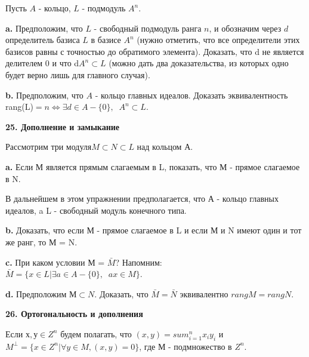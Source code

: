 \documentclass{../template/mai_book}
\begin{document}
\medskip

Пусть $A$ - кольцо, $L$ - подмодуль $A^n$. 

\medskip

{\bf a.} Предположим, что $L$ - свободный подмодуль ранга $n$, и 
обозначим через $d$ определитель базиса $L$ в базисе $A^n$ (нужно отметить, 
что все определители этих базисов равны с точностью до 
обратимого элемента). Доказать, что d не является делителем 0 и что d$A^n \subset L$ 
(можно дать два доказательства, из которых одно будет верно лишь 
для главного случая). 

\medskip

{\bf b.} Предположим, что $A$ - кольцо главных идеалов. Доказать 
эквивалентность rang(L)$ = n\Longleftrightarrow \exists d \in A - \{0\}, \;\;A^n \subset L .$

\pagebreak


{\noindent\bf25. Дополнение и замыкание }

\medskip

Рассмотрим три модуля$ M \subset N \subset L$ над кольцом А. 

\medskip

{\bf a.} Если М является прямым слагаемым в L, показать, что М - 
прямое слагаемое в N. 

\medskip

В дальнейшем в этом упражнении предполагается, что А - кольцо 
главных идеалов, a L - свободный модуль конечного типа. 

\medskip

{\bf b.} Доказать, что если М - прямое слагаемое в L и если М и N 
имеют один и тот же ранг, то М = N. 

\medskip 

{\bf c.} При каком условии М = $\bar{M}$? Напомним: \\
$\bar{M}= \{x \in L|\exists a\in A - \{0\},\;\;ax\in M\}  $. 

\medskip

{\bf d.} Предположим $М \subset N$. Доказать, что $ \bar{M}=\bar{N}$ эквивалентно $rang M = rang N$. \\

\medskip

{\noindent\bf26. Ортогональность и дополнения}

\medskip

Если $х,у\in Z^n $ будем полагать, что $(x,y)=sum^{n}_{i=1}x_iy_i $ и 
$M^{\bot} = \{x \in Z^n|\forall y\in M, (x,y)=0\}$, где М - подмножество в $Z^n$. 

\medskip
\end{document}
